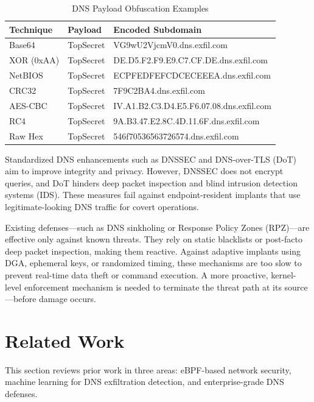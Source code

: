 \documentclass[letterpaper,twocolumn,10pt]{article}
\begin{document}
\begin{table}[htbp]
\footnotesize  %
\centering
\caption{DNS Payload Obfuscation Examples}
\begin{tabularx}{\linewidth}{@{}llX@{}}
\toprule
\textbf{Technique} & \textbf{Payload} & \textbf{Encoded Subdomain} \\
\midrule
Base64     & TopSecret & VG9wU2VjcmV0.dns.exfil.com \\
XOR (0xAA) & TopSecret & DE.D5.F2.F9.E9.C7.CF.DE.dns.exfil.com \\
NetBIOS    & TopSecret & ECPFEDFEFCDCECEEEA.dns.exfil.com \\
CRC32      & TopSecret & 7F9C2BA4.dns.exfil.com \\
AES-CBC    & TopSecret & IV.A1.B2.C3.D4.E5.F6.07.08.dns.exfil.com \\
RC4        & TopSecret & 9A.B3.47.E2.8C.4D.11.6F.dns.exfil.com \\
Raw Hex    & TopSecret & 546f70536563726574.dns.exfil.com \\
\bottomrule
\end{tabularx}
\label{dns_payload_obfuscation}
\end{table}


Standardized DNS enhancements such as DNSSEC and DNS-over-TLS (DoT) aim to improve integrity and privacy. However, DNSSEC does not encrypt queries, and DoT hinders deep packet inspection and blind intrusion detection systems (IDS). These measures fail against endpoint-resident implants that use legitimate-looking DNS traffic for covert operations.

Existing defenses—such as DNS sinkholing or Response Policy Zones (RPZ)—are effective only against known threats. They rely on static blacklists or post-facto deep packet inspection, making them reactive. Against adaptive implants using DGA, ephemeral keys, or randomized timing, these mechanisms are too slow to prevent real-time data theft or command execution. A more proactive, kernel-level enforcement mechanism is needed to terminate the threat path at its source—before damage occurs.

\section{Related Work}
\label{sec:related-word}
This section reviews prior work in three areas: eBPF-based network security, machine learning for DNS exfiltration detection, and enterprise-grade DNS defenses.
\end{document}
